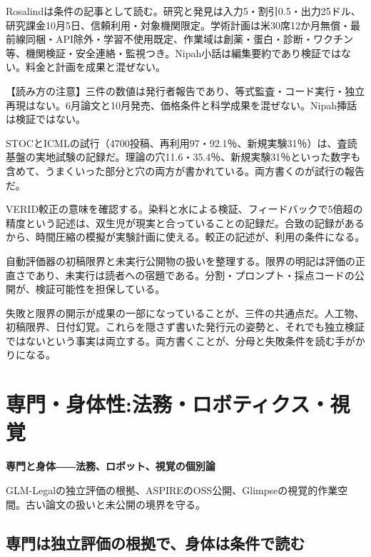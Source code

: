 \documentclass[lualatex,a4paper,10pt]{jlreq}
\begin{document}
Rosalindは条件の記事として読む。研究と発見は入力5・割引0.5・出力25ドル、研究課金10月5日、信頼利用・対象機関限定。学術計画は米30席12か月無償・最前線同梱・API除外・学習不使用既定、作業域は創薬・蛋白・診断・ワクチン等、機関検証・安全連絡・監視つき。Nipah小話は編集要約であり検証ではない。料金と計画を成果と混ぜない。
\cite{B51,B52,B86,B87}


\begin{tcolorbox}[colback=SurveySoft,colframe=SurveyRule,arc=1mm,boxrule=0.4pt,left=2mm,right=2mm]
【読み方の注意】三件の数値は発行者報告であり、等式監査・コード実行・独立再現はない。6月論文と10月発売、価格条件と科学成果を混ぜない。Nipah挿話は検証ではない。
\end{tcolorbox}
\cite{B46,B83,B44,B43,B45,B47,B84,B48,B50,B85,B49,B51,B86,B52,B87}

STOCとICMLの試行（4700投稿、再利用97・92.1％、新規実験31％）は、査読基盤の実地試験の記録だ。理論の穴11.6・35.4％、新規実験31％といった数字も含めて、うまくいった部分と穴の両方が書かれている。両方書くのが試行の報告だ。
\cite{B50,B85,B49}


VERID較正の意味を確認する。染料と水による検証、フィードバックで5倍超の精度という記述は、双生児が現実と合っていることの記録だ。合致の記録があるから、時間圧縮の模擬が実験計画に使える。較正の記述が、利用の条件になる。
\cite{B46,B83,B44,B43,B45}


自動評価器の初稿限界と未実行公開物の扱いを整理する。限界の明記は評価の正直さであり、未実行は読者への宿題である。分割・プロンプト・採点コードの公開が、検証可能性を担保している。
\cite{B47,B84,B48}


失敗と限界の開示が成果の一部になっていることが、三件の共通点だ。人工物、初稿限界、日付幻覚。これらを隠さず書いた発行元の姿勢と、それでも独立検証ではないという事実は両立する。両方書くことが、分母と失敗条件を読む手がかりになる。
\cite{B46,B83,B44,B43,B45,B47,B84,B48,B50,B85,B49}


\section{専門・身体性:法務・ロボティクス・視覚}
\label{sec:P7}

{\Large\bfseries 専門と身体――法務、ロボット、視覚の個別論\par}
\smallskip
{\color{SurveyMuted}GLM-Legalの独立評価の根拠、ASPIREのOSS公開、Glimpseの視覚的作業空間。古い論文の扱いと未公開の境界を守る。\par}
\bigskip

\subsection*{専門は独立評価の根拠で、身体は条件で読む}
\end{document}
